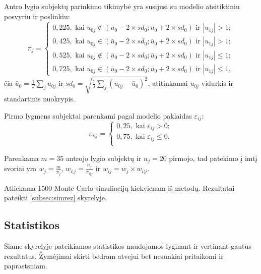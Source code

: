 \documentclass[11pt,a4paper]{article}
\begin{document}
\indent Antro lygio subjektų parinkimo tikimybė yra susijusi su modelio atsitiktiniu posvyriu ir poslinkiu:
\begin{equation*}
\pi_j=
\left\{
\begin{array}{l}
0,225, \text{ kai } u_{0j} \notin \left(\bar{u}_0-2\times sd_0; \bar{u}_0+2\times sd_0\right) \text{ ir } |u_{1j}| > 1;\\
0,425, \text{ kai } u_{0j} \in \left(\bar{u}_0-2\times sd_0; \bar{u}_0+2\times sd_0\right) \text{ ir } |u_{1j}| > 1;\\
0,525, \text{ kai } u_{0j} \notin \left(\bar{u}_0-2\times sd_0; \bar{u}_0+2\times sd_0\right) \text{ ir } |u_{1j}| \leq 1;\\
0,725, \text{ kai } u_{0j} \in \left(\bar{u}_0-2\times sd_0; \bar{u}_0+2\times sd_0\right) \text{ ir } |u_{1j}| \leq 1,
\end{array} \right.
\end{equation*}
\noindent čia $\bar{u}_0=\frac{1}{J}\sum_ju_{0j}$ ir $sd_0=\sqrt{\frac{1}{J}\sum_j(u_{0j}-\bar{u}_0)^2}$, atitinkamai $u_{0j}$ vidurkis ir standartinis nuokrypis. 

\indent Pirmo lygmens subjektai parenkami pagal modelio paklaidas $\varepsilon_{ij}$:
\begin{equation*}
\pi_{i|j}=
\left\{
\begin{array}{l}
0,25, \text{ kai } \varepsilon_{ij}>0;\\
0,75, \text{ kai } \varepsilon_{ij}\leq0.\\

\end{array} \right.
\end{equation*}

\indent Parenkama $m=35$ antrojo lygio subjektų ir $n_j=20$ pirmojo, tad patekimo į imtį svoriai yra $w_j=\frac{m}{\pi_j}$, $w_{i|j}=\frac{n_j}{\pi_{i|j}}$ ir $w_{ij}=w_j\times w_{i|j}$.

\indent Atliekama 1500 Monte Carlo simuliacijų kiekvienam iš metodų. Rezultatai pateikti \ref{subsec:simrez} skyrelyje.


\subsection{Statistikos}\label{subsec:stat}
\indent Šiame skyrelyje pateikiamos statistikos naudojamos lyginant ir vertinant gautus rezultatus. Žymėjimai skirti bedram atvejui bet nesunkiai pritaikomi ir paprastsniam.
\end{document}
